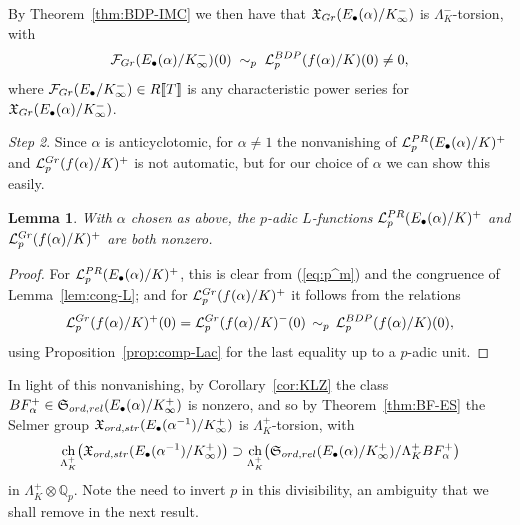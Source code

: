 \documentclass[a4paper,10pt]{amsart}
\numberwithin{equation}{section}
\numberwithin{equation}{section}
\theoremstyle{plain}
\theoremstyle{definition}
\theoremstyle{definition}
\theoremstyle{plain}
\theoremstyle{plain}
\newtheorem{lemma}[thm]{Lemma}
\theoremstyle{plain}
\theoremstyle{plain}
\newcommand{\Q}{\mathbb{Q}}
\newcommand{\X}{\mathfrak{X}}
\newcommand{\sk}{\vspace{0.1in}}
\DeclareMathOperator{\ch}{ch}
\newcommand{\Lcal}{\mathcal{L}}
\newcommand{\Fcal}{\mathcal{F}}
\begin{document}
By Theorem~\ref{thm:BDP-IMC} %
we then have that $\X_{\rm Gr}(E_\bullet(\alpha)/K_\infty^-)$ is $\Lambda_K^-$-torsion, with
\begin{equation}\label{eq:ac-alpha}
\Fcal_{\rm Gr}(E_\bullet(\alpha)/K_\infty^-)(0)\;\sim_p\;\Lcal_p^{\rm BDP}(f(\alpha)/K)(0)\neq 0,%
\end{equation}
where $\Fcal_{\rm Gr}(E_\bullet/K_\infty^-)\in R\llbracket{T}\rrbracket$ is any characteristic power series for $\X_{\rm Gr}(E_\bullet(\alpha)/K_\infty^-)$.
\sk

\noindent\emph{Step 2}. Since $\alpha$ is anticyclotomic, for $\alpha\neq 1$ the nonvanishing of $\Lcal_p^{\rm PR}(E_\bullet(\alpha)/K)^+$ and $\Lcal_p^{\rm Gr}(f(\alpha)/K)^+$ is not automatic, but for our choice of $\alpha$ we can show this easily.

\begin{lemma}\label{lem:nonzeroLs}
With $\alpha$ chosen as above, the $p$-adic $L$-functions $\Lcal_p^{\rm PR}(E_\bullet(\alpha)/K)^+$ and $\Lcal_p^{\rm Gr}(f(\alpha)/K)^+$ are both nonzero.
\end{lemma}

\begin{proof}
For $\Lcal_p^{\rm PR}(E_\bullet(\alpha)/K)^+$, this is clear from (\ref{eq:p^m}) and the congruence of Lemma~\ref{lem:cong-L}; and for $\Lcal_p^{\rm Gr}(f(\alpha)/K)^+$ it follows from the relations
\begin{equation}\label{eq:sim-p}
\Lcal_p^{\rm Gr}(f(\alpha)/K)^+(0)=\Lcal_p^{\rm Gr}(f(\alpha)/K)^-(0)\,\sim_p\,\Lcal_p^{\rm BDP}(f(\alpha)/K)(0),
\end{equation}
using Proposition~\ref{prop:comp-Lac} for the last equality up to a $p$-adic unit.
\end{proof}

In light of this nonvanishing, by Corollary~\ref{cor:KLZ} the class $BF_{\alpha}^+\in\mathfrak{S}_{\rm ord,\rm rel}(E_\bullet(\alpha)/K_\infty^+)$ is nonzero, and so by Theorem~\ref{thm:BF-ES} the Selmer group $\X_{\rm ord,\rm str}(E_\bullet(\alpha^{-1})/K_\infty^+)$ is $\Lambda_K^+$-torsion, with
\begin{equation}\label{eq:BF-div-alpha}
\ch_{\Lambda_K^+}\bigl(\X_{\rm ord,\rm str}(E_\bullet(\alpha^{-1})/K_\infty^+)\bigr)\supset\ch_{\Lambda_K^+}\bigl(\mathfrak{S}_{\rm ord,\rm rel}(E_\bullet(\alpha)/K_\infty^+)/\Lambda_K^+BF_{\alpha}^+\bigr)
\end{equation}
in $\Lambda_K^+\otimes\Q_p$. Note the need to invert $p$ in this divisibility, an ambiguity that we shall remove in the next result.
\end{document}
